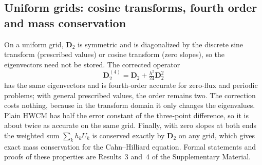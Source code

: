 \documentclass[preprint,12pt]{elsarticle}
\theoremstyle{remark}
\begin{document}
\subsection{Uniform grids: cosine transforms, fourth order and mass conservation}
On a uniform grid, $\mathbf D_2$ is symmetric and is diagonalized by the discrete sine transform (prescribed
values) or cosine transform (zero slopes), so the eigenvectors need not be stored. The corrected operator
\begin{equation}\label{eq:D24}
\mathbf D_2^{(4)}=\mathbf D_2+\tfrac{h^2}{24}\mathbf D_2^2
\end{equation}
has the same eigenvectors and is fourth-order accurate for zero-flux and periodic problems; with general
prescribed values, the order remains two. The correction costs nothing, because in the transform domain it
only changes the eigenvalues. Plain HWCM has half the error constant of the three-point difference, so it
is about twice as accurate on the same grid. Finally, with zero slopes at both ends the weighted sum
$\sum_kh_kU_k$ is conserved exactly by $\mathbf D_2$ on any grid, which gives exact mass conservation for the
Cahn--Hilliard equation. Formal statements and proofs of these properties are Results~3 and~4 of the
Supplementary Material.
\end{document}
